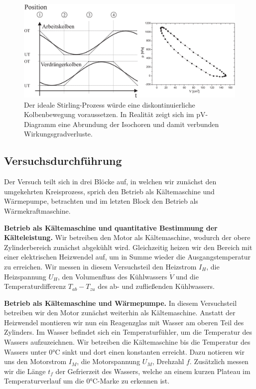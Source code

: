 \begin{figure}[H]
  \centering
  \includegraphics[width=.75\textwidth]{files/real_stirling_process.png}
  \caption{Der ideale Stirling-Prozess würde eine diskontinuierliche Kolbenbewegung voraussetzen. In Realität zeigt sich im pV-Diagramm eine Abrundung der Isochoren und damit verbunden Wirkungsgradverluste.}
  \label{fig:real_stirling_process}
\end{figure}
\newpage\noindent
\subsection{Versuchsdurchführung}

Der Versuch teilt sich in drei Blöcke auf, in welchen wir zunächst den umgekehrten Kreisprozess, sprich den Betrieb als Kältemaschine und Wärmepumpe, betrachten und im letzten Block den Betrieb als Wärmekraftmaschine.

\textbf{Betrieb als Kältemaschine und quantitative Bestimmung der Kälteleistung.} Wir betreiben den Motor als Kältemaschine, wodurch der obere Zylinderbereich zunächst abgekühlt wird. Gleichzeitig heizen wir den Bereich mit einer elektrischen Heizwendel auf, um in \glqq{}Summe\grqq{} wieder die Ausgangstemperatur zu erreichen. Wir messen in diesem Versuchsteil den Heizstrom $I_H$, die Heizspannung $U_H$, den Volumenfluss des Kühlwassers $\dot{V}$ und die Temperaturdifferenz $T_{ab} - T_{zu}$ des ab- und zufließenden Kühlwassers.

\textbf{Betrieb als Kältemaschine und Wärmepumpe.} In diesem Versuchsteil betreiben wir den Motor zunächst weiterhin als Kältemaschine. Anstatt der Heizwendel montieren wir nun ein Reagenzglas mit Wasser am oberen Teil des Zylinders. Im Wasser befindet sich ein Temperaturfühler, um die Temperatur des Wassers aufzuzeichnen. Wir betreiben die Kältemaschine bis die Temperatur des Wassers unter $0\si{\celsius}$ sinkt und dort einen konstanten erreicht. Dazu notieren wir uns den Motorstrom $I_M$, die Motorspannung $U_M$, Drehzahl $f$. Zusätzlich messen wir die Länge $t_f$ der Gefrierzeit des Wassers, welche an einem kurzen Plateau im Temperaturverlauf um die  $0\si{\celsius}$-Marke zu erkennen ist.


